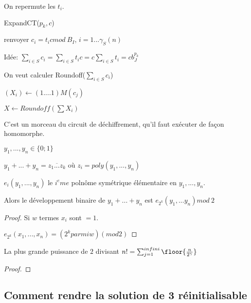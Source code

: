 On repermute les $t_i$.

ExpandCT($p_k,c$)

renvoyer $c_i=t_i c mod \ B_I$, $i=1... \gamma_S(n)$

Idée: $\sum_{i \in S} c_i = \sum_{i \in S} t_i c= c \sum_{i \in S} t_i=c b_J^{p_k}$

On veut calculer Roundoff($\sum_{i \in S} c_i$)

$(X_i) \leftarrow (1....1)M(c_j)$

$X \leftarrow Roundoff(\sum X_i)$

C'est un morceau du circuit de déchiffrement, qu'il faut exécuter de façon homomorphe.

$y_1,...,y_n \in \{0;1\}$

$y_1+...+y_n=\overline{z_1...z_k}$ où $z_i=poly(y_1,...,y_n)$

\begin{lemma}
$e_i(y_1,...,y_n)$ le $i^eme$ polnôme symétrique élémentaire en $y_1,...,y_n$.

Alors le développement binaire de $y_1+...+y_n$ est $e_{2^k} (y_1,...y_n) mod \ 2$
\end{lemma}

\begin{proof}
Si $w$ termes $x_i$ sont $=1$.

$e_{2^k}(x_1,...,x_n)=(2^k parmi w) (mod 2)$
\end{proof}

\begin{lemma}
La plus grande puissance de $2$ divisant $n!= \sum_{j=1}^{infini} \floor{\frac{n}{2 ^{\gamma}}}$
\end{lemma}

\begin{proof}
\end{proof}

\subsection{Comment rendre la solution de 3 réinitialisable}
